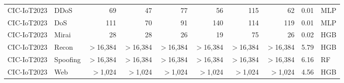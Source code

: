 \begin{table}[ht]
{\begin{tabular}{llrrrrrrrl}
CIC-IoT2023 & DDoS & 69 & 47 & 77 & 56 & 115 & 62 & 0.01 & MLP \\
CIC-IoT2023 & DoS & 111 & 70 & 91 & 140 & 114 & 119 & 0.01 & MLP \\
CIC-IoT2023 & Mirai & 28 & 28 & 26 & 19 & 75 & 26 & 0.02 & HGB \\
CIC-IoT2023 & Recon & $>$16,384 & $>$16,384 & $>$16,384 & $>$16,384 & $>$16,384 & $>$16,384 & 5.79 & HGB \\
CIC-IoT2023 & Spoofing & $>$16,384 & $>$16,384 & $>$16,384 & $>$16,384 & $>$16,384 & $>$16,384 & 6.16 & RF \\
CIC-IoT2023 & Web & $>$1,024 & $>$1,024 & $>$1,024 & $>$1,024 & $>$1,024 & $>$1,024 & 4.56 & HGB \\
\bottomrule
\end{tabular}}
\end{table}

